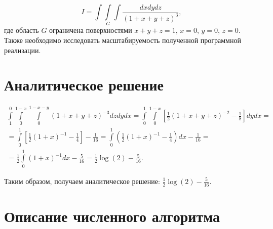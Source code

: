 \documentclass[a4paper, 12pt]{article}
\begin{document}
    \begin{equation}
        I = \int\int\limits_{G}\int \frac{dxdydz}{{(1 + x + y + z)}^3},
    \end{equation}
    где область $G$ ограничена поверхностями $x + y + z = 1$, $x = 0$, $y = 0$, $z = 0$.\\
    
    Также необходимо исследовать масштабируемость полученной программной реализации.

\section{Аналитическое решение}

    \begin{multline}
        \int\limits_1^0\int\limits_{0}^{1-x}\int\limits_{0}^{1 - x - y} {\left(1 + x + y + z\right)}^{-3} dzdydx = \int\limits_{0}^{1}\int\limits_{0}^{1-x} \left[\frac{1}{2}{\left(1+x+y+z\right)}^{-2} - \frac{1}{8}\right]dydx = \\
        = \int\limits_{0}^{1} \left[ \frac{1}{2}{\left( 1 + x \right)}^{-1} - \frac{1}{4} \right] - \frac{1}{16} = \int\limits_{0}^{1} \left( \frac{1}{2} {\left( 1 + x \right)}^{-1} - \frac{1}{4} \right) dx - \frac{1}{16} = \\
        = \frac{1}{2} \int\limits_{0}^{1} {\left( 1 + x \right)}^{-1} dx - \frac{5}{16} = \frac{1}{2} \log\left( 2 \right) - \frac{5}{16}.
    \end{multline}

    Таким образом, получаем аналитическое решение: $\frac{1}{2}\log\left( 2 \right) - \frac{5}{16}$.

\section{Описание численного алгоритма}
\end{document}
